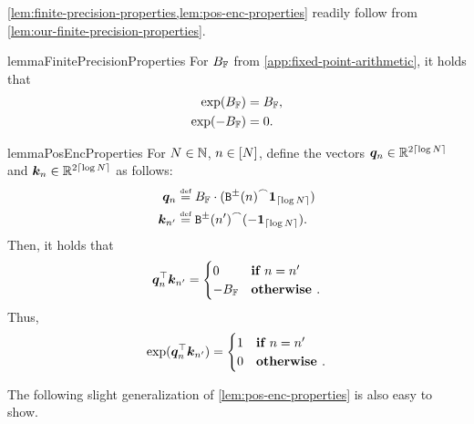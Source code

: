 \cref{lem:finite-precision-properties,lem:pos-enc-properties} readily follow from \cref{lem:our-finite-precision-properties}.
\begin{restatable}{lemma}{FinitePrecisionProperties} \label{lem:finite-precision-properties}
   For ${{B_{{{\mathbb{F}}}}}}$ from \cref{app:fixed-point-arithmetic}, it holds that
   \begin{subequations}
      \begin{align}
         \exp({{B_{{{\mathbb{F}}}}}}) &= {{B_{{{\mathbb{F}}}}}}, \\
         \exp(-{{B_{{{\mathbb{F}}}}}}) &= 0.
      \end{align}
   \end{subequations}
\end{restatable}
\begin{restatable}{lemma}{PosEncProperties} \label{lem:pos-enc-properties}
   For ${{N}} \in {{\mathbb{N}}}$, ${{n}} \in {\left[ {{N}}\right]}$, define the vectors ${{{\bm{q}}}}_{{n}} \in {{\mathbb{R}}}^{2 \lceil\log{{N}}\rceil}$ and ${{{\bm{k}}}}_{{n}} \in {{\mathbb{R}}}^{2 \lceil\log{{N}}\rceil}$ as follows:
   \begin{subequations}
      \begin{align}
         \vq_\stridx &\defeq \maxFNum \cdot (\interleaveFun{\sbinFun{\stridx}}{\one_{\ceil{\log\strlen}}}) \\
         \vk_{\stridx'} &\defeq \interleaveFun{\sbinFun{\stridx'}}{(-\one_{\ceil{\log\strlen}})}.
      \end{align}
   \end{subequations}
   Then, it holds that
   \begin{equation}
      {{{{{\bm{q}}}}_{{n}}^\top {{{\bm{k}}}}_{{{n}}'}}} =
      \begin{cases}
         0 & \textbf{if } {{n}} = {{n}}' \\
         -{{B_{{{\mathbb{F}}}}}} & \textbf{otherwise }.
      \end{cases}
   \end{equation}
   Thus, 
   \begin{equation}
      \exp({{{{{\bm{q}}}}_{{n}}^\top {{{\bm{k}}}}_{{{n}}'}}}) =
      \begin{cases}
         1 & \textbf{if } {{n}} = {{n}}' \\
         0 & \textbf{otherwise }.
      \end{cases}
   \end{equation}
\end{restatable}
The following slight generalization of \cref{lem:pos-enc-properties} is also easy to show.
